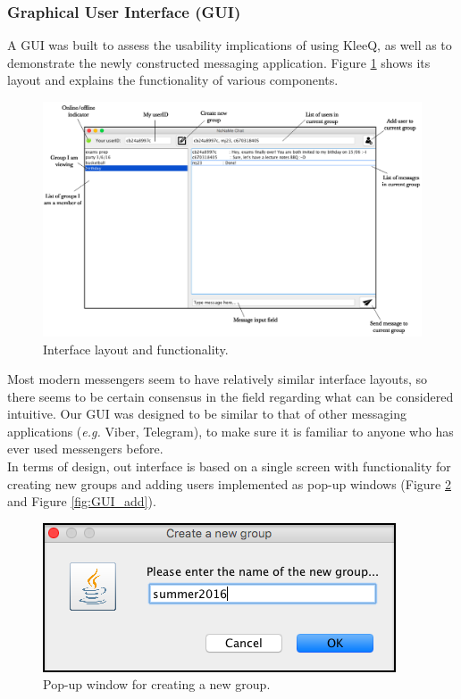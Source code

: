 \documentclass[a4paper, twoside, 12pt]{report}
\begin{document}
\subsubsection{Graphical User Interface (GUI)}
A GUI was built to assess the usability implications of using KleeQ, as well as to demonstrate the newly constructed messaging application. Figure \ref{fig:GUI} shows its layout and explains the functionality of various components.
\begin{figure}[H]
    \captionsetup{width=0.84\textwidth}
    \centering
    \includegraphics[width=0.98\linewidth]{pics/GUI.png}
    \caption{\label{fig:GUI} Interface layout and functionality.}
\end{figure}
Most modern messengers seem to have relatively similar interface layouts, so there seems to be certain consensus in the field regarding what can be considered intuitive. Our GUI was designed to be similar to that of other messaging applications (\textit{e.g.} Viber, Telegram), to make sure it is familiar to anyone who has ever used messengers before. \\

In terms of design, out interface is based on a single screen with functionality for creating new groups and adding users implemented as pop-up windows (Figure \ref{fig:GUI_create} and Figure \ref{fig:GUI_add}).

\begin{figure}[H]
    \captionsetup{width=0.84\textwidth}
    \centering
    \includegraphics[width=0.5\linewidth]{pics/GUI_create.png}
    \caption{\label{fig:GUI_create} Pop-up window for creating a new group.}
\end{figure}
\end{document}
